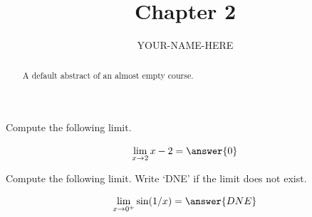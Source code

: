 \documentclass{ximera}
\title{Chapter 2}
\author{YOUR-NAME-HERE}
\begin{document}
\begin{abstract}
    A default abstract of an almost empty course.
\end{abstract}
\maketitle


\begin{exercise}
Compute the following limit.
\begin{prompt}
\[
\lim\limits_{x\to 2} x-2 = \answer{0}
\]
\end{prompt}    
\end{exercise}



\begin{exercise}
Compute the following limit. Write `DNE' if the limit does not exist.
\begin{prompt}
\[
\lim\limits_{x\to 0^+} \sin(1/x) = \answer{DNE}
\]
\end{prompt}    
\end{exercise}
\end{document}
